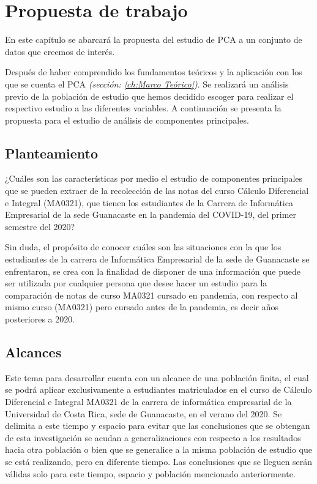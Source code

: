 \chapter{Propuesta de trabajo}

En este capítulo se abarcará la propuesta del estudio de PCA a un conjunto de datos que creemos de interés. 

Después de haber comprendido los fundamentos teóricos y la aplicación con los que se cuenta el PCA \textit{(sección: \ref{ch:Marco Teórico})}. Se realizará un análisis previo de la población de estudio que hemos decidido escoger para realizar el respectivo estudio  a las diferentes variables. A continuación se presenta la propuesta para el estudio de análisis de componentes principales. 

\section{Planteamiento}

¿Cuáles son las características por medio el estudio de componentes principales que se pueden extraer de la recolección de las notas del curso Cálculo Diferencial e Integral (MA0321), que tienen los estudiantes de la Carrera de Informática Empresarial de la sede Guanacaste en la pandemia del COVID-19, del primer semestre del 2020?

Sin duda, el propósito de conocer cuáles son las situaciones con la que los estudiantes de la carrera de Informática Empresarial de la sede de Guanacaste se enfrentaron, se crea con la finalidad de disponer de una información que puede ser utilizada por cualquier persona que desee hacer un estudio para la comparación de notas de curso MA0321 cursado en pandemia, con respecto al mismo curso (MA0321) pero cursado antes de la pandemia, es decir años posteriores a 2020. 

\section{Alcances}
Este tema para desarrollar cuenta con un alcance de una población finita, el cual se podrá aplicar exclusivamente a estudiantes matriculados en el curso de Cálculo Diferencial e Integral MA0321 de la carrera de informática empresarial de la Universidad de Costa Rica, sede de Guanacaste, en el verano del 2020. Se delimita a este tiempo y espacio para evitar que las conclusiones que se obtengan de esta investigación se acudan a generalizaciones con respecto a los resultados hacia otra población o bien que se generalice a la misma población de estudio que se está realizando, pero en diferente tiempo. Las conclusiones que se lleguen serán válidas solo para este tiempo, espacio y población mencionado anteriormente.

